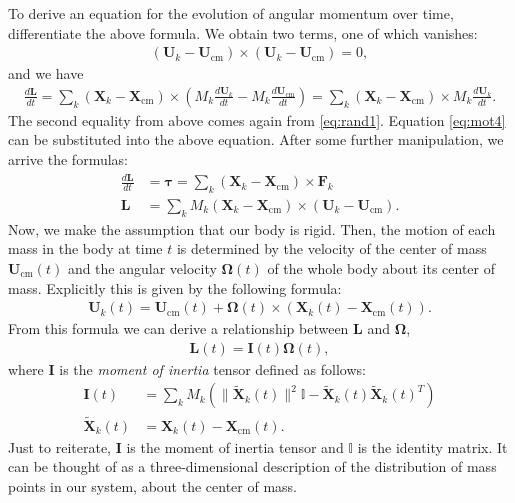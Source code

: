 \documentclass[10pt]{article}
\newcommand{\bs}[1]{{\boldsymbol #1}}
\begin{document}
To derive an equation for the evolution of angular momentum over time, differentiate the above formula.  We obtain two terms, one of which vanishes:
\begin{align*}
({\bs U}_k - {\bs U}_\text{cm}) \times ({\bs U}_k - {\bs U}_\text{cm}) = 0,
\end{align*}
and we have 
\begin{align*}
\frac{d{\bs L}}{dt} = \sum_k ({\bs X}_k - {\bs X}_\text{cm}) \times \left(M_k \frac{d{\bs U}_k}{dt} - M_k\frac{d {\bs U}_\text{cm}}{dt}\right) =  \sum_k ({\bs X}_k - {\bs X}_\text{cm}) \times M_k \frac{d{\bs U}_k}{dt}. 
\end{align*}
The second equality from above comes again from \eqref{eq:rand1}.  Equation \eqref{eq:mot4} can be substituted into the above equation.  After some further manipulation, we arrive the formulas:
\begin{align*}
\frac{d {\bs L}}{dt} &= {\bs \tau} = \sum_k ({\bs X}_k - {\bs X}_\text{cm}) \times {\bs F}_k \\
{\bs L} &= \sum_k M_k ({\bs X}_k - {\bs X}_\text{cm}) \times ({\bs U}_k - {\bs U}_\text{cm}).
\end{align*}
Now, we make the assumption that our body is rigid.  Then, the motion of each mass in the body at time $t$ is determined by the velocity of the center of mass ${\bs U}_\text{cm}(t)$ and the angular velocity ${\bs \Omega}(t)$ of the whole body about its center of mass.  Explicitly this is given by the following formula:
\begin{align}
\label{eq:rigmot3}
{\bs U}_k(t) = {\bs U}_\text{cm}(t) + {\bs \Omega}(t) \times ({\bs X}_k(t) - {\bs X}_\text{cm}(t)).
\end{align}  
From this formula we can derive a relationship between ${\bs L}$ and ${\bs \Omega}$,
\begin{align}
\label{eq:rigmot4}
{\bs L}(t) = {\bs I}(t) {\bs \Omega}(t),
\end{align}
where ${\bs I}$ is the {\em moment of inertia} tensor defined as follows:
\begin{align*}
{\bs I}(t) &= \sum_k M_k \left( \| \tilde{{\bs X}}_k(t) \|^2 \mathbb{I} - \tilde{{\bs X}}_k(t) \tilde{{\bs X}}_k(t)^T \right) \\
\tilde{{\bs X}}_k(t) &= {\bs X}_k(t) - {\bs X}_\text{cm}(t).
\end{align*}
Just to reiterate, ${\bs I}$ is the moment of inertia tensor and $\mathbb{I}$ is the identity matrix.  It can be thought of as a three-dimensional description of the distribution of mass points in our system, about the center of mass.
\end{document}
